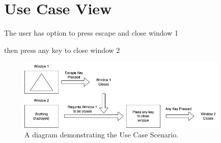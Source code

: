 \section{Use Case View}
\label{section:useCaseView}

The user has option to press escape and close window 1

then press any key to close window 2

\begin{figure}[htb]
    \centering
    \includegraphics[width=10cm]{./Images/UseCaseView.png}
       \caption{A diagram demonstrating the Use Case Scenario.}
           \label{Fig:Fig10}
\end{figure}